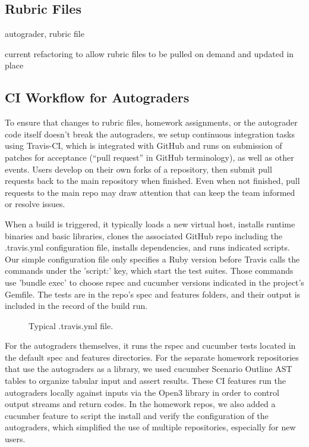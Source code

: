 \subsection{Rubric Files}

autograder, rubric file

current refactoring to allow rubric files to be pulled on demand and
updated in place

\subsection{CI Workflow for Autograders}

To ensure that changes to rubric files, homework assignments, or the
autograder code itself doesn't break the autograders, 
we setup continuous integration tasks using Travis-CI, which is integrated with
GitHub and runs on submission of patches for acceptance (``pull request''
in GitHub terminology), as well as other events. Users develop on their
own forks of a repository, then submit pull requests back to the main
repository when finished. Even when not finished, pull requests to the
main repo may draw attention that can keep the team informed or resolve
issues. 

When a build is triggered, it typically loads a new virtual host, installs runtime binaries and basic libraries, clones the associated GitHub repo including the .travis.yml configuration file, installs dependencies, and runs indicated scripts. Our simple configuration file only specifies a Ruby version before Travis calls the commands under the 'script:' key, which start the test suites. Those commands use 'bundle exec' to choose rspec and cucumber versions indicated in the project's Gemfile. The tests are in the repo's spec and features folders, and their output is included in the record of the build run.

\begin{figure}[!htbp]
  \centering
  \begin{minipage}{0.70\textwidth}%
  \lstset{tabsize=1,basicstyle=\scriptsize\ttfamily}%
  \end{minipage}
  \caption{\label{fig:rag-ci}%
  Typical .travis.yml file.
}
\end{figure}

For the autograders themselves, it runs the rspec and cucumber tests located in the default spec and features directories. For the separate homework repositories that use the autograders as a library, we used cucumber Scenario Outline AST tables to organize tabular input and assert results. These CI features run the autograders locally against inputs via the Open3 library in order to control output streams and return codes. In the homework repos, we also added a cucumber feature to script the install and verify the configuration of the autograders, which simplified the use of multiple repositories, especially for new users.

